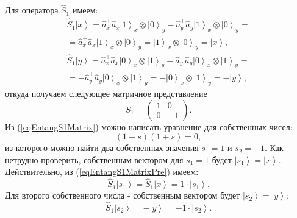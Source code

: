 Для оператора $\hat{S}_1$ имеем:
\begin{eqnarray}
\hat{S}_1 \left|x\right> = \hat{a}_x^{+} \hat{a}_x
\left|1\right>_x\otimes\left|0\right>_y - \hat{a}_y^{+}
\hat{a}_y\left|1\right>_x\otimes\left|0\right>_y =
\nonumber \\
= 
\hat{a}_x^{+} \hat{a}_x
\left|1\right>_x\otimes\left|0\right>_y =
\left|1\right>_x\otimes\left|0\right>_y = \left|x\right>,
\nonumber \\
\hat{S}_1 \left|y\right> = \hat{a}_x^{+} \hat{a}_x
\left|0\right>_x\otimes\left|1\right>_y - \hat{a}_y^{+}
\hat{a}_y\left|0\right>_x\otimes\left|1\right>_y =
\nonumber \\
=
-\hat{a}_y^{+}
\hat{a}_y\left|0\right>_x\otimes\left|1\right>_y
=-\left|0\right>_x\otimes\left|1\right>_y = -\left|y\right>,
\label{eqEntangS1MatrixPre}
\end{eqnarray}
откуда получаем следующее матричное представление
\begin{equation}
\hat{S}_1 = 
\left(
\begin{array}{cc}
1 & 0 \\
0 & -1 
\end{array}
\right).
\label{eqEntangS1Matrix}
\end{equation}
Из (\ref{eqEntangS1Matrix}) можно написать уравнение для собственных
чисел:
\[
\left(1-s\right)\left(1 + s\right) = 0,
\]
из которого можно найти два собственных значения $s_1 = 1$ и
$s_2 = -1$. Как нетрудно проверить, собственным вектором для $s_1 = 1$
будет $\left|s_1\right> = \left|x\right>$. Действительно, из (\ref{eqEntangS1MatrixPre})
имеем:
\begin{equation}
\hat{S}_1 \left|s_1\right> = \hat{S}_1 \left|x\right> = 1 \cdot \left|s_1\right>.
\nonumber
\end{equation}
Для второго собственного числа - собственным вектором будет
$\left|s_2\right> = \left|y\right>$:
\begin{equation}
\hat{S}_1 \left|s_2\right>  = - \left|y\right> = -1 \cdot \left|s_2\right>.
\nonumber
\end{equation}


